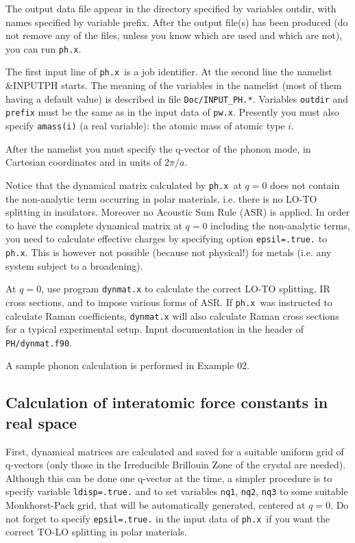 \documentclass[12pt,a4paper]{article}
\def\pwx{\texttt{pw.x}}
\def\phx{\texttt{ph.x}}
\begin{document}
The output data file appear in the directory specified by variables outdir,
with names specified by variable prefix. After the output file(s) has been
produced (do not remove any of the files, unless you know which are used
and which are not), you can run \phx.
    
The first input line of \phx\ is a job identifier. At the second line the
namelist \&INPUTPH starts. The meaning of the variables in the namelist
(most of them having a default value) is described in file 
\texttt{Doc/INPUT\_PH.*}. Variables \texttt{outdir} and \texttt{prefix} 
must be the same as in the input data of \pwx. Presently
you must also specify \texttt{amass(i)} (a real variable): the atomic mass 
of atomic type $i$.

After the namelist you must specify the q-vector of the phonon mode,
in Cartesian coordinates and in units of $2\pi/a$.
    
Notice that the dynamical matrix calculated by \phx\ at $q=0$ does not
contain the non-analytic term occurring in polar materials, i.e. there is no
LO-TO splitting in insulators. Moreover no Acoustic Sum Rule (ASR) is
applied. In order to have the complete dynamical matrix at $q=0$ including
the non-analytic terms, you need to calculate effective charges by specifying
option \texttt{epsil=.true.} to \phx. This is however not possible (because
not physical!) for metals (i.e. any system subject to a broadening).

At $q=0$, use program \texttt{dynmat.x} to calculate the correct LO-TO 
splitting, IR cross sections, and to impose various forms of ASR. 
If \phx\ was instructed to calculate Raman coefficients, 
\texttt{dynmat.x} will also calculate Raman cross sections
for a typical experimental setup.
Input documentation in the header of \texttt{PH/dynmat.f90}.

A sample phonon calculation is performed in Example 02.

\subsection{Calculation of interatomic force constants in real space}

First, dynamical matrices are calculated and saved for a suitable uniform 
grid of q-vectors (only those in the Irreducible Brillouin Zone of the
crystal are needed). Although this can be done one q-vector at the time, a
simpler procedure is to specify variable \texttt{ldisp=.true.} and to set 
variables \texttt{nq1}, \texttt{nq2}, \texttt{nq3} to some suitable 
Monkhorst-Pack grid, that will be automatically generated, centered at $q=0$. 
Do not forget to specify \texttt{epsil=.true.} in the input data of
\phx\ if you want the correct TO-LO splitting in polar
materials.
    
\end{document}

